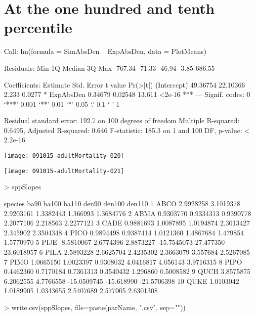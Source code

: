 \documentclass{article}
\begin{document}
\section{At the one hundred and tenth percentile}
\begin{Schunk}
\begin{Soutput}
Call:
lm(formula = SimAbsDen ~ ExpAbsDen, data = PlotMeans)

Residuals:
    Min      1Q  Median      3Q     Max 
-767.34  -71.33  -46.94   -3.85  686.55 

Coefficients:
            Estimate Std. Error t value Pr(>|t|)    
(Intercept) 49.36754   22.10366   2.233   0.0277 *  
ExpAbsDen    0.34679    0.02548  13.611   <2e-16 ***
---
Signif. codes:  0 ‘***’ 0.001 ‘**’ 0.01 ‘*’ 0.05 ‘.’ 0.1 ‘ ’ 1

Residual standard error: 192.7 on 100 degrees of freedom
Multiple R-squared:  0.6495,	Adjusted R-squared:  0.646 
F-statistic: 185.3 on 1 and 100 DF,  p-value: < 2.2e-16
\end{Soutput}
\end{Schunk}
\texttt{[image: 091015-adultMortality-020]}

\texttt{[image: 091015-adultMortality-021]}
\begin{Schunk}
\begin{Sinput}
>   sppSlopes
\end{Sinput}
\begin{Soutput}
   species       ba90     ba100     ba110       den90     den100      den110
1     ABCO  2.9928258 3.1019378 2.9203161   1.3382443   1.366993   1.3684776
2     ABMA  0.9303770 0.9334313 0.9390778   2.2077106   2.218563   2.2277121
3     CADE  0.9881693 1.0087895 1.0194874   2.3013427   2.345902   2.3504348
4     PICO  0.9894498 0.9387414 1.0121360   1.4867684   1.479854   1.5770970
5     PIJE -8.5810067 2.6774396 2.8873227 -15.7545073  27.477350  23.6018957
6     PILA  2.5893228 2.6625704 2.4235302   2.3663079   3.557684   2.5267085
7     PIMO  1.0665150 1.0023397 0.9308032   4.0416817   4.056143   3.9716315
8     PIPO  0.4462360 0.7170184 0.7361313   0.3540432   1.296860   0.5008582
9     QUCH  3.8575875 6.2062555 4.7766558 -15.0509745 -15.618990 -21.5706398
10    QUKE  1.0103042 1.0189905 1.0343655   2.5407689   2.577005   2.6301308
\end{Soutput}
\begin{Sinput}
>     write.csv(sppSlopes, file=paste(parName, ".csv", sep=""))
\end{Sinput}
\end{Schunk}
\end{document}
